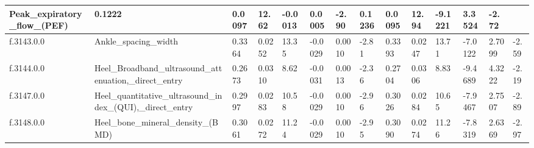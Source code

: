 \begin{longtable}{llllllllllllll}
  \multicolumn{1}{l|}{Peak\_expiratory\_flow\_(PEF)} &
  \multicolumn{1}{l|}{0.1222} &
  \multicolumn{1}{l|}{0.0097} &
  \multicolumn{1}{l|}{12.62} &
  \multicolumn{1}{l|}{-0.0013} &
  \multicolumn{1}{l|}{0.0005} &
  \multicolumn{1}{l|}{-2.90} &
  \multicolumn{1}{l|}{0.1236} &
  \multicolumn{1}{l|}{0.0095} &
  \multicolumn{1}{l|}{12.94} &
  \multicolumn{1}{l|}{-9.1221} &
  \multicolumn{1}{l|}{3.3524} &
  \multicolumn{1}{l|}{-2.72} \\ \hline
\multicolumn{1}{|l|}{f.3143.0.0} &
  \multicolumn{1}{l|}{Ankle\_spacing\_width} &
  \multicolumn{1}{l|}{0.3364} &
  \multicolumn{1}{l|}{0.0252} &
  \multicolumn{1}{l|}{13.35} &
  \multicolumn{1}{l|}{-0.0029} &
  \multicolumn{1}{l|}{0.0010} &
  \multicolumn{1}{l|}{-2.81} &
  \multicolumn{1}{l|}{0.3393} &
  \multicolumn{1}{l|}{0.0247} &
  \multicolumn{1}{l|}{13.71} &
  \multicolumn{1}{l|}{-7.0122} &
  \multicolumn{1}{l|}{2.7099} &
  \multicolumn{1}{l|}{-2.59} \\ \hline
\multicolumn{1}{|l|}{f.3144.0.0} &
  \multicolumn{1}{l|}{Heel\_Broadband\_ultrasound\_attenuation,\_direct\_entry} &
  \multicolumn{1}{l|}{0.2673} &
  \multicolumn{1}{l|}{0.0310} &
  \multicolumn{1}{l|}{8.62} &
  \multicolumn{1}{l|}{-0.0031} &
  \multicolumn{1}{l|}{0.0013} &
  \multicolumn{1}{l|}{-2.36} &
  \multicolumn{1}{l|}{0.2704} &
  \multicolumn{1}{l|}{0.0306} &
  \multicolumn{1}{l|}{8.83} &
  \multicolumn{1}{l|}{-9.4689} &
  \multicolumn{1}{l|}{4.3222} &
  \multicolumn{1}{l|}{-2.19} \\ \hline
\multicolumn{1}{|l|}{f.3147.0.0} &
  \multicolumn{1}{l|}{Heel\_quantitative\_ultrasound\_index\_(QUI),\_direct\_entry} &
  \multicolumn{1}{l|}{0.2997} &
  \multicolumn{1}{l|}{0.0283} &
  \multicolumn{1}{l|}{10.58} &
  \multicolumn{1}{l|}{-0.0029} &
  \multicolumn{1}{l|}{0.0010} &
  \multicolumn{1}{l|}{-2.96} &
  \multicolumn{1}{l|}{0.3026} &
  \multicolumn{1}{l|}{0.0284} &
  \multicolumn{1}{l|}{10.65} &
  \multicolumn{1}{l|}{-7.9467} &
  \multicolumn{1}{l|}{2.7507} &
  \multicolumn{1}{l|}{-2.89} \\ \hline
\multicolumn{1}{|l|}{f.3148.0.0} &
  \multicolumn{1}{l|}{Heel\_bone\_mineral\_density\_(BMD)} &
  \multicolumn{1}{l|}{0.3061} &
  \multicolumn{1}{l|}{0.0272} &
  \multicolumn{1}{l|}{11.24} &
  \multicolumn{1}{l|}{-0.0029} &
  \multicolumn{1}{l|}{0.0010} &
  \multicolumn{1}{l|}{-2.95} &
  \multicolumn{1}{l|}{0.3090} &
  \multicolumn{1}{l|}{0.0274} &
  \multicolumn{1}{l|}{11.26} &
  \multicolumn{1}{l|}{-7.8319} &
  \multicolumn{1}{l|}{2.6369} &
  \multicolumn{1}{l|}{-2.97} \\ \hline

\end{longtable}
